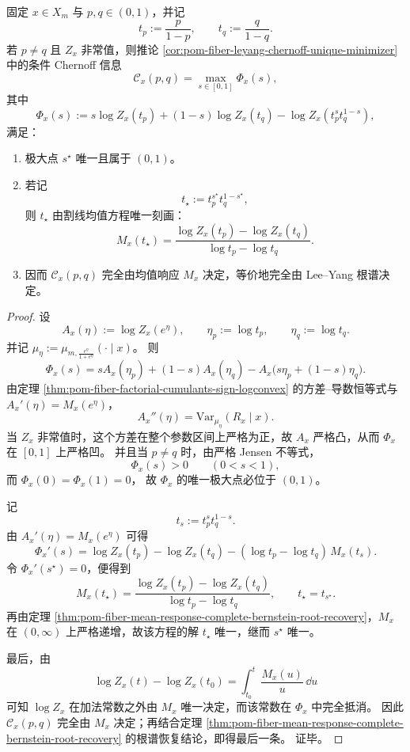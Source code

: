 \begin{theorem}\label{thm:pom-fiber-chernoff-secant-law-unique-maximizer}
固定 \(x\in X_m\) 与 \(p,q\in(0,1)\)，并记
\[
t_p:=\frac{p}{1-p},
\qquad
t_q:=\frac{q}{1-q}.
\]
若 \(p\neq q\) 且 \(Z_x\) 非常值，则推论
\ref{cor:pom-fiber-leyang-chernoff-unique-minimizer} 中的条件 Chernoff 信息
\[
\mathcal C_x(p,q)
=
\max_{s\in[0,1]}\Phi_x(s),
\]
其中
\[
\Phi_x(s):=
s\log Z_x(t_p)+(1-s)\log Z_x(t_q)-\log Z_x(t_p^s t_q^{1-s}),
\]
满足：
\begin{enumerate}
  \item 极大点 \(s^\star\) 唯一且属于 \((0,1)\)。
  \item 若记
  \[
  t_\star:=t_p^{s^\star}t_q^{1-s^\star},
  \]
  则 \(t_\star\) 由割线均值方程唯一刻画：
  \[
  M_x(t_\star)
  =
  \frac{\log Z_x(t_p)-\log Z_x(t_q)}{\log t_p-\log t_q}.
  \]
  \item 因而 \(\mathcal C_x(p,q)\) 完全由均值响应 \(M_x\) 决定，等价地完全由 Lee--Yang 根谱决定。
\end{enumerate}
\end{theorem}
\begin{proof}
设
\[
A_x(\eta):=\log Z_x(e^\eta),
\qquad
\eta_p:=\log t_p,
\qquad
\eta_q:=\log t_q.
\]
并记
\(
\mu_\eta:=\mu_{m,\frac{e^\eta}{1+e^\eta}}(\cdot\mid x)
\)。
则
\[
\Phi_x(s)=sA_x(\eta_p)+(1-s)A_x(\eta_q)-A_x\bigl(s\eta_p+(1-s)\eta_q\bigr).
\]
由定理 \ref{thm:pom-fiber-factorial-cumulants-sign-logconvex} 的方差--导数恒等式与
\(
A_x'(\eta)=M_x(e^\eta)
\)，
\[
A_x''(\eta)=\mathrm{Var}_{\mu_\eta}(R_x\mid x).
\]
当 \(Z_x\) 非常值时，这个方差在整个参数区间上严格为正，故 \(A_x\) 严格凸，从而 \(\Phi_x\) 在 \([0,1]\) 上严格凹。
并且当 \(p\neq q\) 时，由严格 Jensen 不等式，
\[
\Phi_x(s)>0
\qquad(0<s<1),
\]
而
\(
\Phi_x(0)=\Phi_x(1)=0
\)，
故 \(\Phi_x\) 的唯一极大点必位于 \((0,1)\)。

记
\[
t_s:=t_p^s t_q^{1-s}.
\]
由 \(A_x'(\eta)=M_x(e^\eta)\) 可得
\[
\Phi_x'(s)
=
\log Z_x(t_p)-\log Z_x(t_q)-(\log t_p-\log t_q)\,M_x(t_s).
\]
令 \(\Phi_x'(s^\star)=0\)，便得到
\[
M_x(t_\star)
=
\frac{\log Z_x(t_p)-\log Z_x(t_q)}{\log t_p-\log t_q},
\qquad
t_\star=t_{s^\star}.
\]
再由定理 \ref{thm:pom-fiber-mean-response-complete-bernstein-root-recovery}，\(M_x\) 在 \((0,\infty)\) 上严格递增，故该方程的解 \(t_\star\) 唯一，继而 \(s^\star\) 唯一。

最后，由
\[
\log Z_x(t)-\log Z_x(t_0)
=
\int_{t_0}^{t}\frac{M_x(u)}{u}\,\dd u
\]
可知 \(\log Z_x\) 在加法常数之外由 \(M_x\) 唯一决定，而该常数在 \(\Phi_x\) 中完全抵消。
因此 \(\mathcal C_x(p,q)\) 完全由 \(M_x\) 决定；再结合定理 \ref{thm:pom-fiber-mean-response-complete-bernstein-root-recovery} 的根谱恢复结论，即得最后一条。
证毕。
\end{proof}
